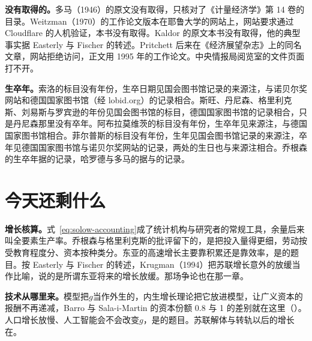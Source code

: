 \begin{deeper}[史料说明]
\textbf{没有取得的。}多马（1946）的原文没有取得，只核对了《计量经济学》第 14 卷的目录。Weitzman（1970）的工作论文版本在耶鲁大学的网站上，网站要求通过 Cloudflare 的人机验证，本书没有取得。Kaldor 的原文本书没有取得，他的典型事实据 Easterly 与 Fischer 的转述。Pritchett 后来在《经济展望杂志》上的同名文章，网站拒绝访问，正文用 1995 年的工作论文。中央情报局阅览室的文件页面打不开。

\textbf{生卒年。}索洛的标目没有年份，生卒日期见国会图书馆记录的来源注，与诺贝尔奖网站和德国国家图书馆（经 lobid.org）的记录相合。斯旺、丹尼森、格里利克斯、刘易斯与罗宾逊的年份见国会图书馆的标目，德国国家图书馆的记录相合，只是丹尼森那里没有卒年。阿布拉莫维茨的标目没有年份，生卒年见来源注，与德国国家图书馆相合。菲尔普斯的标目没有年份，生年见国会图书馆记录的来源注，卒年见德国国家图书馆与诺贝尔奖网站的记录，两处的生日也与来源注相合。乔根森的生卒年据的记录，哈罗德与多马的据与的记录\cite{loc40,gnd40,nobel2006}。
\end{deeper}

\section{今天还剩什么}\label{sec:solow-legacy}

\textbf{增长核算。}式~\eqref{eq:solow-accounting}成了统计机构与研究者的常规工具，余量后来叫全要素生产率。乔根森与格里利克斯的批评留下的，是把投入量得更细，劳动按受教育程度分、资本按种类分。东亚的高速增长主要靠积累还是靠效率，是的题目。按 Easterly 与 Fischer 的转述，Krugman（1994）把苏联增长意外的放缓当作比喻，说的是所谓东亚将来的增长放缓\cite{ef1995}。那场争论也在那一章。

\textbf{技术从哪里来。}模型把$g$当作外生的，内生增长理论把它放进模型，让广义资本的报酬不再递减，Barro 与 Sala-i-Martin 的资本份额 0.8 与 1 的差别就在这里（）。人口增长放慢、人工智能会不会改变$g$，是的题目。苏联解体与转轨以后的增长在。


